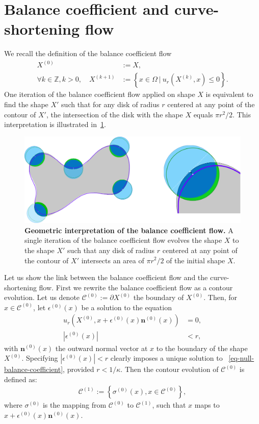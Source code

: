 \documentclass[review]{siamart220329}
\newcommand{\Z}{\mathbb{Z}}
\newcommand{\C}{\mathcal{C}} %
\begin{document}
\section{Balance coefficient and curve-shortening flow}\label{sec:balance-coefficient-and-csf}
%
%
We recall the definition of the balance coefficient flow
%
%
\begin{align}
  X^{(0)} & := X, \nonumber \\
  \forall k \in \Z, k > 0, \quad X^{(k+1)} & := \left\{ x \in \Omega \: | \: u_r(X^{(k)}, x) \leq 0 \right\}.
\end{align}
%
%
%
One iteration of the balance coefficient flow applied on shape $X$ is
equivalent to find the shape $X'$ such that for any disk of radius $r$ centered
at any point of the contour of $X'$, the intersection of the disk with the
shape $X$ equals $\pi r^2/2$. This interpretation is illustrated
in~\cref{fig:geometric-interpretation}.
%
% 
\begin{figure}
\center
\includegraphics[scale=0.25]{figures/zero-level-set/geometric-interpretation.png}
\caption{\textbf{Geometric interpretation of the balance coefficient flow.} A
single iteration of the balance coefficient flow evolves the shape $X$ to
the shape $X'$ such that any disk of radius $r$ centered at any point of the
contour of $X'$ intersects  an area of $\pi r^2/2$ of the initial shape
$X$.}
\label{fig:geometric-interpretation}
\end{figure}
% 
%

Let us show the link between the balance coefficient flow and the
curve-shortening flow. First we rewrite the balance coefficient flow
as a contour evolution. Let us denote $\C^{(0)} := \partial
X^{(0)}$ the boundary of $X^{(0)}$. Then, for $x \in \C^{(0)}$,
let $\epsilon^{(0)}(x)$ be a solution to the equation
\begin{align} \label{eq-null-balance-coefficient}
  u_r(X^{(0)}, x +\epsilon^{(0)}(x)
  \mathbf{n}^{(0)}(x)) & = 0, \\
  |\epsilon^{(0)}(x)| & < r, \nonumber
\end{align}
with $\mathbf{n}^{(0)}(x)$ the outward normal vector at $x$ to
the boundary of the shape $X^{(0)}$. Specifying
$|\epsilon^{(0)}(x)| < r$ clearly imposes a unique solution to
~\cref{eq-null-balance-coefficient}, provided $r < 1/\kappa$. Then the
contour evolution of $\C^{(0)}$ is defined as:
\begin{align} \label{eq-balance-coefficient-contour-flow}
  \C^{(1)} := \left\{ \sigma^{(0)}(x), x \in \C^{(0)} \right\},
\end{align}
where $\sigma^{(0)}$ is the mapping from $\C^{(0)}$ to $\C^{(1)}$, such that $x$ maps to $x+\epsilon^{(0)}(x) \mathbf{n}^{(0)}(x)$.
\end{document}
